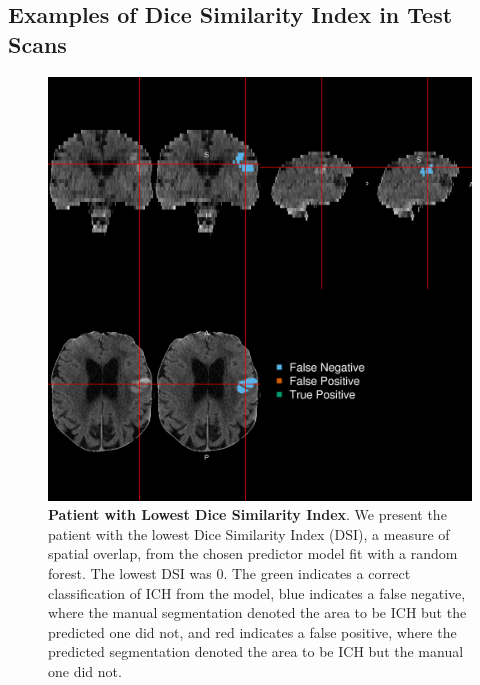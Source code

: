 \documentclass{elsarticle_nonatbib}\usepackage[]{graphicx}\usepackage[]{color}
\begin{document}
\subsection{Examples of Dice Similarity Index in Test Scans}
\begin{figure}
\centering
\includegraphics[width=0.75\linewidth,keepaspectratio]{Reseg_Figure_DSI_Quantile_000_native.png}
\caption{{\bf Patient with  Lowest Dice Similarity Index}. We present the patient with the lowest Dice Similarity Index (DSI), a measure of spatial overlap, from the chosen predictor model fit with a random forest.  The lowest DSI was 0. The green indicates a correct classification of ICH from the model, blue indicates a false negative, where the manual segmentation denoted the area to be ICH but the predicted one did not, and red indicates a false positive, where the predicted segmentation denoted the area to be ICH but the manual one did not. }
\label{fig:dice_img0}
\end{figure}
\end{document}
